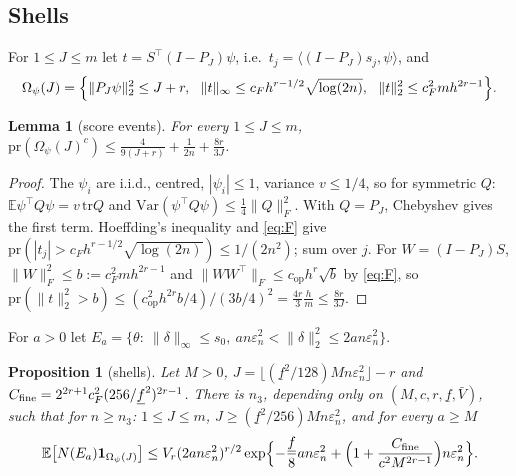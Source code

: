 \documentclass[11pt]{article}
\newtheorem{lemma}{Lemma}
\newtheorem{proposition}{Proposition}
\theoremstyle{definition}
\theoremstyle{remark}
\newcommand{\E}{\mathbb{E}}
\newcommand{\pr}{\mathrm{pr}}
\newcommand{\en}{\varepsilon_n}
\newcommand{\fl}{\underline f}
\newcommand{\Vb}{\bar V}
\newcommand{\ind}{\mathbf 1}
\newcommand{\op}{\mathrm{op}}
\begin{document}
\subsection{Shells}

For $1\le J\le m$ let $t=S^\top(I-P_J)\psi$, i.e.\ $t_j=\langle(I-P_J)s_j,\psi\rangle$, and
\[
\Omega_\psi(J)=\Bigl\{\|P_J\psi\|_2^2\le J+r,\ \ \|t\|_\infty\le c_Fh^{r-1/2}\sqrt{\log(2n)},\ \ \|t\|_2^2\le c_F^2mh^{2r-1}\Bigr\}.
\]

\begin{lemma}[score events]\label{lem:score}
For every $1\le J\le m$, $\pr(\Omega_\psi(J)^c)\le\frac4{9(J+r)}+\frac1{2n}+\frac{8r}{3J}$.
\end{lemma}

\begin{proof}
The $\psi_i$ are i.i.d., centred, $|\psi_i|\le1$, variance $v\le1/4$, so for symmetric $Q$: $\E\psi^\top Q\psi=v\,\mathrm{tr}Q$ and $\mathrm{Var}(\psi^\top Q\psi)\le\frac14\|Q\|_F^2$. With $Q=P_J$, Chebyshev gives the first term. Hoeffding's inequality and \eqref{eq:F} give $\pr(|t_j|>c_Fh^{r-1/2}\sqrt{\log(2n)})\le1/(2n^2)$; sum over $j$. For $W=(I-P_J)S$, $\|W\|_F^2\le b:=c_F^2mh^{2r-1}$ and $\|WW^\top\|_F\le c_{\op}h^r\sqrt b$ by \eqref{eq:F}, so $\pr(\|t\|_2^2>b)\le(c_{\op}^2h^{2r}b/4)/(3b/4)^2=\frac{4r}3\frac hm\le\frac{8r}{3J}$.
\end{proof}

For $a>0$ let $E_a=\{\theta:\ \|\delta\|_\infty\le s_0,\ an\en^2<\|\delta\|_2^2\le2an\en^2\}$.

\begin{proposition}[shells]\label{prop:shell}
Let $M>0$, $J=\lfloor(\fl^2/128)Mn\en^2\rfloor-r$ and $C_{\rm fine}=2^{2r+1}c_F^2(256/\fl^2)^{2r-1}$. There is $n_3$, depending only on $(M,c,r,\fl,\Vb)$, such that for $n\ge n_3$: $1\le J\le m$, $J\ge(\fl^2/256)Mn\en^2$, and for every $a\ge M$
\[
\E\bigl[N(E_a)\ind_{\Omega_\psi(J)}\bigr]\le V_r(2an\en^2)^{r/2}\exp\Bigl\{-\frac{\fl}8an\en^2+\Bigl(1+\frac{C_{\rm fine}}{c^2M^{2r-1}}\Bigr)n\en^2\Bigr\}.
\]
\end{proposition}
\end{document}

